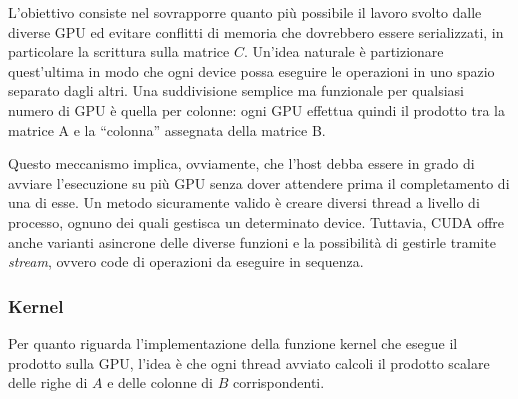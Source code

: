 \documentclass[a4paper]{article}
\begin{document}
L'obiettivo consiste nel sovrapporre quanto più possibile il lavoro svolto dalle diverse GPU ed evitare conflitti di memoria che dovrebbero essere serializzati, in particolare la scrittura sulla matrice $C$. Un'idea naturale è partizionare quest'ultima in modo che ogni device possa eseguire le operazioni in uno spazio separato dagli altri.
Una suddivisione semplice ma funzionale per qualsiasi numero di GPU è quella per colonne: ogni GPU effettua quindi il prodotto tra la matrice A e la ``colonna'' assegnata della matrice B.




Questo meccanismo implica, ovviamente, che l'host debba essere in grado di avviare l'esecuzione su più GPU senza dover attendere prima il completamento di una di esse.
Un metodo sicuramente valido è creare diversi thread a livello di processo, ognuno dei quali gestisca un determinato device.
Tuttavia, CUDA offre anche varianti asincrone delle diverse funzioni e la possibilità di gestirle tramite \textit{stream}, ovvero code di operazioni da eseguire in sequenza.


\subsubsection{Kernel}
Per quanto riguarda l'implementazione della funzione kernel che esegue il prodotto sulla GPU, l'idea è che ogni thread avviato calcoli il prodotto scalare delle righe di $A$ e delle colonne di $B$ corrispondenti.
\end{document}
